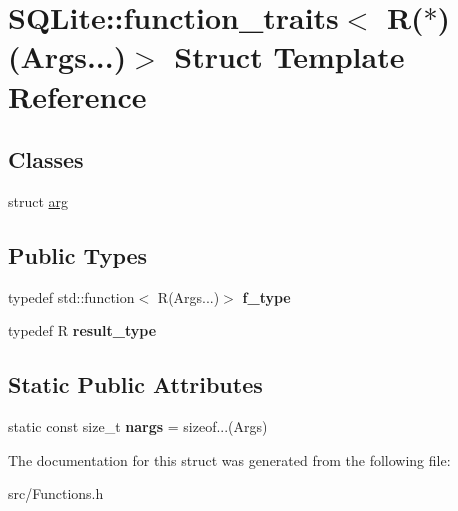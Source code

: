 \hypertarget{struct_s_q_lite_1_1function__traits_3_01_r_07_5_08_07_args_8_8_8_08_4}{\section{S\-Q\-Lite\-:\-:function\-\_\-traits$<$ R($\ast$)(Args...)$>$ Struct Template Reference}
\label{struct_s_q_lite_1_1function__traits_3_01_r_07_5_08_07_args_8_8_8_08_4}
}
\subsection*{Classes}
\begin{DoxyCompactItemize}
\item 
struct \hyperlink{struct_s_q_lite_1_1function__traits_3_01_r_07_5_08_07_args_8_8_8_08_4_1_1arg}{arg}
\end{DoxyCompactItemize}
\subsection*{Public Types}
\begin{DoxyCompactItemize}
\item 
\hypertarget{struct_s_q_lite_1_1function__traits_3_01_r_07_5_08_07_args_8_8_8_08_4_afcf9cc79ab2beea01be6a226df1e928d}{typedef std\-::function$<$ R(Args...)$>$ {\bfseries f\-\_\-type}}\label{struct_s_q_lite_1_1function__traits_3_01_r_07_5_08_07_args_8_8_8_08_4_afcf9cc79ab2beea01be6a226df1e928d}

\item 
\hypertarget{struct_s_q_lite_1_1function__traits_3_01_r_07_5_08_07_args_8_8_8_08_4_a85e42a040d0c12404d671e71d48a260d}{typedef R {\bfseries result\-\_\-type}}\label{struct_s_q_lite_1_1function__traits_3_01_r_07_5_08_07_args_8_8_8_08_4_a85e42a040d0c12404d671e71d48a260d}

\end{DoxyCompactItemize}
\subsection*{Static Public Attributes}
\begin{DoxyCompactItemize}
\item 
\hypertarget{struct_s_q_lite_1_1function__traits_3_01_r_07_5_08_07_args_8_8_8_08_4_afa9f09de2f05f1bb4280ce85a1aba027}{static const size\-\_\-t {\bfseries nargs} = sizeof...(Args)}\label{struct_s_q_lite_1_1function__traits_3_01_r_07_5_08_07_args_8_8_8_08_4_afa9f09de2f05f1bb4280ce85a1aba027}

\end{DoxyCompactItemize}


The documentation for this struct was generated from the following file\-:\begin{DoxyCompactItemize}
\item 
src/Functions.\-h\end{DoxyCompactItemize}
